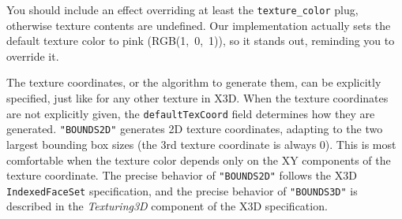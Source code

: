 \documentclass{egpubl}
\begin{document}

You should include an effect overriding at least the \texttt{texture\_color}
plug, otherwise texture contents are undefined. Our implementation actually
sets the default texture color to pink (RGB(1,~0,~1)), so it stands out,
reminding you to override it.

The texture coordinates, or the algorithm to generate them,
can be explicitly specified, just like for any other texture in X3D.
When the texture coordinates are not explicitly given,
the \texttt{defaultTexCoord} field determines how they are generated.
\texttt{"BOUNDS2D"} generates 2D texture coordinates,
adapting to the two largest bounding box sizes
(the 3rd texture coordinate is always 0). This is most comfortable
when the texture color depends only on the XY components of the texture coordinate.
The precise behavior
of \texttt{"BOUNDS2D"} follows the X3D \texttt{IndexedFaceSet} specification,
and the precise behavior of \texttt{"BOUNDS3D"} is described in
the \textit{Texturing3D} component of the X3D specification.




\end{document}
